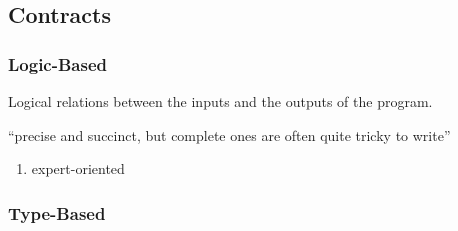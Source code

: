 \subsection{Contracts}

\subsubsection{Logic-Based}
Logical relations between the inputs and the outputs of the program.

``precise and succinct, but complete ones are often quite tricky to write''

\begin{enumerate}
\item expert-oriented
\end{enumerate}

\subsubsection{Type-Based}




